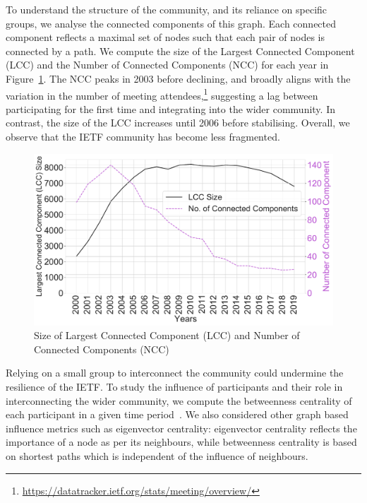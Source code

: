 \documentclass[twocolumn,10pt]{article}
\newlength{\figureWidthOneColumn}
\newcommand{\pb}[1]{\vspace{0.75ex}\noindent{\textbf{#1}}}
\begin{document}
To understand the structure of the community, and its reliance on specific
groups, we analyse the connected components of this graph. Each connected
component reflects a maximal set of nodes such that each pair of nodes is
connected by a path. We compute the size of the Largest Connected Component
(LCC) and the Number of Connected Components (NCC) for each year in
Figure~\ref{fig:lcc_size_yearly}.  The NCC peaks in 2003 before declining,
and broadly aligns with the variation in the number of meeting
attendees,\footnote{\url{https://datatracker.ietf.org/stats/meeting/overview/}}
suggesting a lag between participating for the first time and integrating
into the wider community.  In contrast, the size of the LCC increases until
2006 before stabilising.  Overall, we observe that the IETF community has
become less fragmented.

\begin{figure}
  \centering
  \includegraphics[width=\figureWidthOneColumn]{figures-prev/icwsm-2022/lcc_yearly_no_components.pdf}
  \caption{
    Size of Largest Connected Component (LCC) and Number of Connected
    Components (NCC)
  }
  \label{fig:lcc_size_yearly}
\end{figure}

\pb{Influence}
Relying on a small group to interconnect the community could undermine the
resilience of the IETF.  To study the influence of participants and their
role in interconnecting the wider community, we compute the betweenness
centrality of each participant in a given time
period~\cite{kourtellis2013identifying, weitzel2012measuring,
sole2014centrality}. We also considered other graph based influence metrics
such as eigenvector centrality: eigenvector centrality reflects the
importance of a node as per its neighbours, while betweenness centrality is
based on shortest paths which is independent of the influence of
neighbours.
\end{document}
